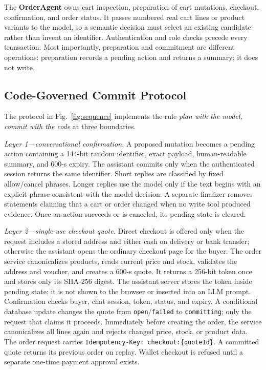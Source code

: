 \documentclass{IEEEtran}
\newcommand{\code}[1]{\texttt{\small #1}}
\begin{document}
The \textbf{OrderAgent} owns cart inspection, preparation of cart mutations, checkout, confirmation, and order status. It passes numbered real cart lines or product variants to the model, so a semantic decision must select an existing candidate rather than invent an identifier. Authentication and role checks precede every transaction. Most importantly, preparation and commitment are different operations: preparation records a pending action and returns a summary; it does not write.

\subsection{Code-Governed Commit Protocol}

The protocol in Fig.~\ref{fig:sequence} implements the rule \emph{plan with the model, commit with the code} at three boundaries.

\textit{Layer 1---conversational confirmation.} A proposed mutation becomes a pending action containing a 144-bit random identifier, exact payload, human-readable summary, and 600-s expiry. The assistant commits only when the authenticated session returns the same identifier. Short replies are classified by fixed allow/cancel phrases. Longer replies use the model only if the text begins with an explicit phrase consistent with the model decision. A separate finalizer removes statements claiming that a cart or order changed when no write tool produced evidence. Once an action succeeds or is canceled, its pending state is cleared.

\textit{Layer 2---single-use checkout quote.} Direct checkout is offered only when the request includes a stored address and either cash on delivery or bank transfer; otherwise the assistant opens the ordinary checkout page for the buyer. The order service canonicalizes products, reads current price and stock, validates the address and voucher, and creates a 600-s quote. It returns a 256-bit token once and stores only its SHA-256 digest. The assistant server stores the token inside pending state; it is not shown to the browser or inserted into an LLM prompt. Confirmation checks buyer, chat session, token, status, and expiry. A conditional database update changes the quote from \code{open}/\code{failed} to \code{committing}; only the request that claims it proceeds. Immediately before creating the order, the service canonicalizes all lines again and rejects changed price, stock, or product data. The order request carries \code{Idempotency-Key: checkout:\{quoteId\}}. A committed quote returns its previous order on replay. Wallet checkout is refused until a separate one-time payment approval exists.
\end{document}
